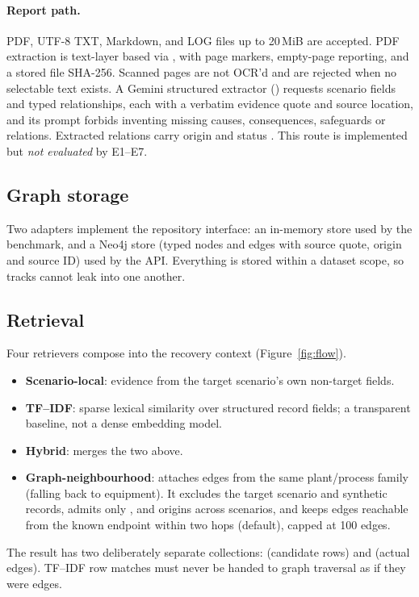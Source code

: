 \documentclass[10pt,twocolumn,a4paper]{extarticle}
\begin{document}
\paragraph{Report path.} PDF, UTF-8 TXT, Markdown, and LOG files up to 20\,MiB are accepted. PDF extraction is text-layer based via , with page markers, empty-page reporting, and a stored file SHA-256. Scanned pages are not OCR'd and are rejected when no selectable text exists. A Gemini structured extractor () requests scenario fields and typed relationships, each with a verbatim evidence quote and source location, and its prompt forbids inventing missing causes, consequences, safeguards or relations. Extracted relations carry origin  and status . This route is implemented but \emph{not evaluated} by E1--E7.

\subsection{Graph storage}
Two adapters implement the repository interface: an in-memory store used by the benchmark, and a Neo4j store (typed nodes and edges with source quote, origin and source ID) used by the API. Everything is stored within a dataset scope, so tracks cannot leak into one another.

\subsection{Retrieval}
Four retrievers compose into the recovery context (Figure~\ref{fig:flow}).
\begin{itemize}
  \item \textbf{Scenario-local}: evidence from the target scenario's own non-target fields.
  \item \textbf{TF--IDF}: sparse lexical similarity over structured record fields; a transparent baseline, not a dense embedding model.
  \item \textbf{Hybrid}: merges the two above.
  \item \textbf{Graph-neighbourhood}: attaches edges from the same plant/process family (falling back to equipment). It excludes the target scenario and synthetic records, admits only ,  and  origins across scenarios, and keeps edges reachable from the known endpoint within two hops (default), capped at 100 edges.
\end{itemize}
The result has two deliberately separate collections:  (candidate rows) and  (actual edges). TF--IDF row matches must never be handed to graph traversal as if they were edges.
\end{document}
